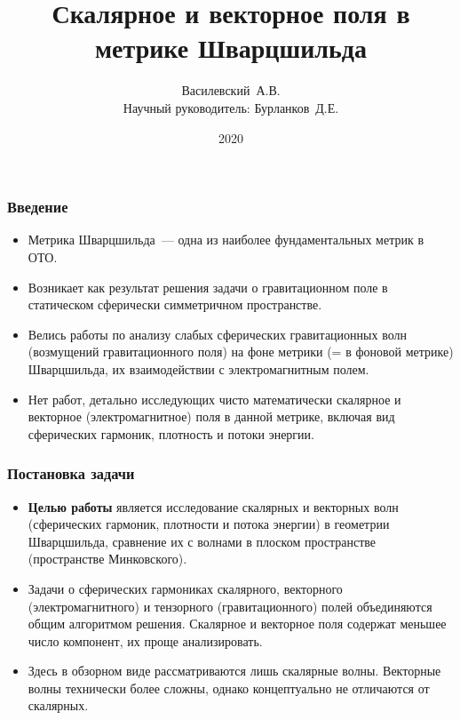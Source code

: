 \documentclass[compress, 9pt]{beamer}
\title{Скалярное и векторное поля в метрике Шварцшильда}
\author[Василевский~А.В.]{
    Василевский~А.В. \\[\baselineskip]
    {\footnotesize Научный руководитель: Бурланков~Д.Е.}
}
\institute[ННГУ]{Нижегородский университет им. Н.И.~Лобачевского}
\date{2020}
\begin{document}
    \frame[plain]{\titlepage}

    \begin{frame}\frametitle{Введение}

        \begin{itemize}\justifying
            \item Метрика Шварцшильда~--- одна из наиболее фундаментальных метрик в ОТО.
            \item Возникает как результат решения задачи о гравитационном поле в статическом сферически симметричном пространстве.
            \item Велись работы по анализу слабых сферических гравитационных волн (возмущений гравитационного поля) на фоне метрики (= в фоновой метрике) Шварцшильда\nocite{regge_wheeler_1957,Vas2019b}, их взаимодействии с электромагнитным полем.
            \item Нет работ, детально исследующих чисто математически скалярное и векторное (электромагнитное) поля в данной метрике, включая вид сферических гармоник, плотность и потоки энергии.
        \end{itemize}

    \end{frame}

    \begin{frame}\frametitle{Постановка задачи}

        \begin{itemize}\justifying
            \item \textbf{Целью работы} является исследование скалярных и векторных волн (сферических гармоник, плотности и потока энергии) в геометрии Шварцшильда, сравнение их с волнами в плоском пространстве (пространстве Минковского).

            \item Задачи о сферических гармониках скалярного, векторного (электромагнитного) и тензорного (гравитационного) полей объединяются общим алгоритмом решения. Скалярное и векторное поля содержат меньшее число компонент, их проще анализировать.

            \item Здесь в обзорном виде рассматриваются лишь скалярные волны. Векторные волны технически более сложны, однако концептуально не отличаются от скалярных.
        \end{itemize}

    \end{frame}
\end{document}
